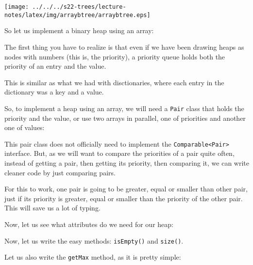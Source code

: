 \documentclass[a4paper, 9pt]{extarticle}
\newcommand{\separator}{\begin{center}%
\noindent\makebox[\linewidth]{\rule{0.75\paperwidth}{0.4pt}}%
\end{center}}
\begin{document}
\begin{center}
  \texttt{[image: ../../../s22-trees/lecture-notes/latex/img/arraybtree/arraybtree.eps]}
\end{center}

So let us implement a binary heap using an array:


\begin{multicols}{2}
The first thing you have to realize is that even if we have been drawing heaps
as nodes with numbers (this is, the priority), a priority queue holds both the
priority of an entry and the value.

This is similar as what we had with disctionaries, where each entry in the
dictionary was a key and a value.

So, to implement a heap using an array, we will need a \texttt{Pair} class that
holds the priority and the value, or use two arrays in parallel, one of
priorities and another one of values:

This pair class does not officially need to implement the
\texttt{Comparable<Pair>} interface. But, as we will want to compare the
priorities of a pair quite often, instead of getting a pair, then getting its
priority, then comparing it, we can write cleaner code by just comparing pairs.

For this to work, one pair is going to be greater, equal or smaller than other
pair, just if its priority is greater, equal or smaller than the priority of
the other pair. This will save us a lot of typing.
\columnbreak

\end{multicols}

\separator

Now, let us see what attributes do we need for our heap:


\newpage

Now, let us write the easy methods: \texttt{isEmpty()} and \texttt{size()}.


Let us also write the \texttt{getMax} method, as it is pretty simple:

\end{document}
